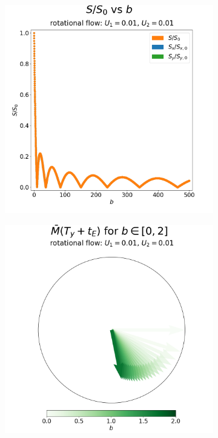 \begin{figure}
\begin{subfigure}{0.4\textwidth}
                    \includegraphics[width=\textwidth]{diagrams/results-mri/simple-tests/mri-spins_sall-vs-b_2D_rotational_test_4.png}
                    \caption{}
                    \label{fig:mri-rotational:s-vs-b}
                \end{subfigure}
                \begin{subfigure}{0.4\textwidth}
                    \centering
                    \includegraphics[width=\textwidth]{diagrams/results-mri/simple-tests/mri-spins_b_2D_rotational_test_4.png}

\end{subfigure}
\end{figure}
